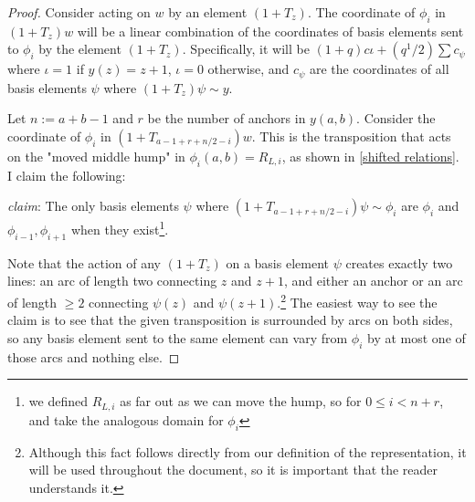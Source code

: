 \documentclass{amsart}
\begin{document}
\begin{proof}
	Consider acting on $w$ by an element $(1+T_z)$. The coordinate of $\phi_i$ in $(1+T_z)w$ will be a linear combination of the coordinates of basis elements sent to $\phi_i$ by the element $(1+T_z)$. Specifically, it will be $(1+q)c\iota+(q^1/2)\sum c_\psi$ where $\iota=1$ if $y(z)=z+1$, $\iota=0$ otherwise, and $c_\psi$ are the coordinates of all basis elements $\psi$ where $(1+T_z)\psi\sim y$.
	
	Let $n:=a+b-1$ and $r$ be the number of anchors in $y(a,b)$. Consider the coordinate of $\phi_i$ in $(1+T_{a-1+r+n/2-i})w$. This is the transposition that acts on the "moved middle hump" in $\phi_i(a,b)=R_{L,i}$, as shown in \ref{shifted relations}. I claim the following:
	
	\begin{center}
		\textit{claim}:
		The only basis elements $\psi$ where $(1+T_{a-1+r+n/2-i})\psi\sim \phi_i$ are $\phi_i$ and $\phi_{i-1},\phi_{i+1}$ when they exist\footnote{we defined $R_{L,i}$ as far out as we can move the hump, so for $0\leq i<n+r$, and take the analogous domain for $\phi_i$}.
		
	\end{center}
	
	Note that the action of any $(1+T_z)$ on a basis element $\psi$ creates exactly two lines: an arc of length two connecting $z$ and $z+1$, and either an anchor or an arc of length $\geq 2$ connecting $\psi(z)$ and $\psi(z+1)$.\footnote{Although this fact follows directly from our definition of the representation, it will be used throughout the document, so it is important that the reader understands it.\label{two humps created}} The easiest way to see the claim is to see that the given transposition is surrounded by arcs on both sides, so any basis element sent to the same element can vary from $\phi_i$ by at most one of those arcs and nothing else. 
	

\end{proof}
\end{document}
